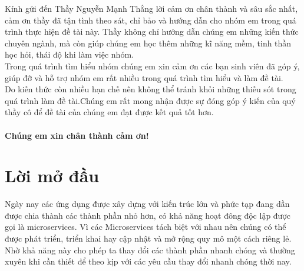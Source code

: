 \documentclass[12pt,a4paper]{report}
\begin{document}
	\hspace{1cm} Kính gửi đến Thầy Nguyễn Mạnh Thắng lời cảm ơn chân thành và sâu sắc nhất, cảm ơn thầy đã tận tình theo sát, chỉ bảo và hướng dẫn cho nhóm em trong quá trình thực hiện đề tài này. Thầy không chỉ hướng dẫn chúng em những kiến thức chuyên ngành, mà còn giúp chúng em học thêm những kĩ năng mềm, tinh thần học hỏi, thái độ khi làm việc nhóm.\\
	
	\hspace{1cm}Trong quá trình tìm hiểu nhóm chúng em xin cảm ơn các bạn sinh viên đã góp ý, giúp đỡ và hỗ trợ nhóm em rất nhiều trong quá trình tìm hiểu và làm đề tài.\\
	
	\hspace{1cm}Do kiến thức còn nhiều hạn chế nên không thể tránh khỏi những thiếu sót trong quá trình làm đề tài.Chúng em rất mong nhận được sự đóng góp ý kiến của quý thầy cô để đề tài của chúng em đạt được kết quả tốt hơn.\\
	\bigskip \\
	\textbf{Chúng em xin chân thành cảm ơn!}
	\chapter*{\centering Lời mở đầu}
	\hspace{1cm}{Nhiều năm trước, hầu hết các ứng dụng phần mềm đều được xây dựng với kiến trúc monolith hay còn gọi là kiến trúc 1 khối là mẫu thiết kế được dùng nhiều nhất trong giới lập trình web hiện nay bởi tính đơn giản của nó khi phát triển và khi triển khai. Các ứng dụng này chạy dưới dạng một tiến trình đơn lẻ hoặc số lượng nhỏ các tiến trình trên một số ít máy chủ. Chúng có khả năng cập nhật và nâng cấp chậm và yêu cầu nâng cấp thường xuyên. Trong trường hợp có sự cố như lỗi phần cứng hệ thống phần mềm này sẽ phải được di chuyển một cách thủ công sang các máy chủ còn hoạt động tốt.\\}
	
	{\hspace{1cm}Ngày nay các ứng dụng được xây dựng với kiến trúc lớn và phức tạp đang dần được chia thành các thành phần nhỏ hơn, có khả năng hoạt đông độc lập được gọi là microservices. Vì các Microservices tách biệt với nhau nên chúng có thể được phát triển, triển khai hay cập nhật và mở rộng quy mô một cách riêng lẻ. Nhờ khả năng này cho phép ta thay đổi các thành phần nhanh chóng và thường xuyên khi cần thiết để theo kịp với các yêu cầu thay đổi nhanh chóng thời nay.\\}
	
\end{document}
